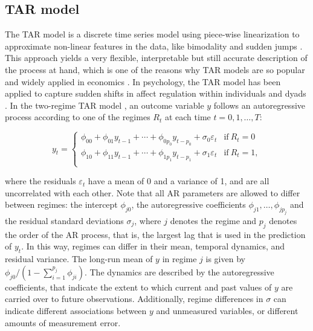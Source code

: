 \documentclass{article}
\begin{document}
\subsection{TAR model}
The TAR model is a discrete time series model using piece-wise linearization to approximate non-linear features in the data, like bimodality and sudden jumps \citep{tar}.
This approach yields a very flexible, interpretable but still accurate description of the process at hand, which is one of the reasons why TAR models are so popular and widely applied in economics \citep{tar_in_economics}.
In psychology, the TAR model has been applied to capture sudden shifts in affect regulation within individuals \citep{tar_affect_person1, tar_affect_person2} and dyads \citep{tar_affect_dyadic1, tar_affect_dyadic2}.
In the two-regime TAR model \citet{tar}, an outcome variable $y$ follows an autoregressive process according to one of the regimes $R_t$ at each time $t = 0, 1, \dots, T$:

\begin{equation}
y_t = 
\begin{cases}
\phi_{00} + \phi_{01} y_{t-1} + \cdots + \phi_{0 p_0} y_{t-p_0} + \sigma_{0} \varepsilon_t & \text{if}~R_{t} = 0\\
\phi_{10} + \phi_{11} y_{t-1} + \cdots + \phi_{1 p_1} y_{t-p_1} + \sigma_{1} \varepsilon_t & \text{if}~R_{t} = 1, \\
\end{cases}
\label{eqn:ar_processes}
\end{equation}

where the residuals $\varepsilon_t$ have a mean of 0 and a variance of 1, and are all uncorrelated with each other.
Note that all AR parameters are allowed to differ between regimes: the intercept $\phi_{j0}$, the autoregressive coefficients $\phi_{j1}, \dots, \phi_{j p_j}$ and the residual standard deviations $\sigma_j$, where $j$ denotes the regime and $p_j$ denotes the order of the AR process, that is, the largest lag that is used in the prediction of $y_t$.
In this way, regimes can differ in their mean, temporal dynamics, and residual variance.
The long-run mean of $y$ in regime $j$ is given by $\phi_{j0}/(1 - \sum_{i=1}^{p_j} \phi_{ji})$. 
The dynamics are described by the autoregressive coefficients, that indicate the extent to which current and past values of $y$ are carried over to future observations.
Additionally, regime differences in $\sigma$ can indicate different associations between $y$ and unmeasured variables, or different amounts of measurement error.
\end{document}

